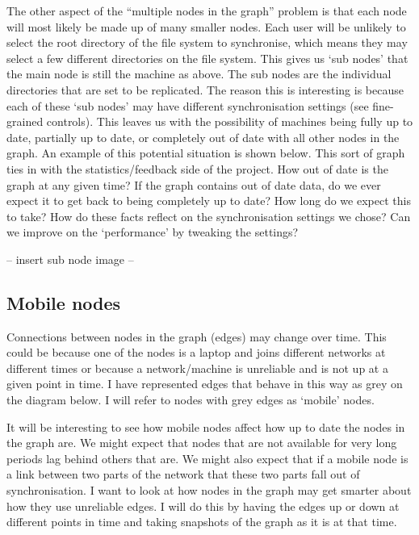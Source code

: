 \documentclass[12pt]{article}
\begin{document}
The other aspect of the ``multiple nodes in the graph'' problem
is that each node will most likely be made up of many smaller nodes.
Each user will be unlikely to select the root directory of the
file system to synchronise, which means they may select a few
different directories on the file system. This gives us ‘sub nodes’
that the main node is still the machine as above. The sub nodes are
the individual directories that are set to be replicated.
The reason this is interesting is because each of these ‘sub nodes’
may have different synchronisation settings (see fine-grained controls).
This leaves us with the possibility of machines being fully up to date,
partially up to date, or completely out of date with all other nodes in
the graph. 
%
An example of this potential situation is shown below.
This sort of graph ties in with the statistics/feedback side of the
project. How out of date is the graph at any given time?
If the graph contains out of date data, do we ever expect it
to get back  to being completely up to date? How long do we expect
this to take? How do these facts reflect on the synchronisation settings
we chose? Can we improve on the ‘performance’ by tweaking the settings?

-- insert sub node image --

\subsection{Mobile nodes}

Connections between nodes in the graph (edges) may
change over time. This could be because one of the nodes
is a laptop and joins different networks at different
times or because a network/machine is unreliable and is
not up at a given point in time. I have represented
edges that behave in this way as grey on the diagram below.
I will refer to nodes with grey edges as `mobile' nodes.

It will be interesting to see how mobile nodes affect how
up to date the nodes in the graph are. We might expect that
nodes that are not available for very long periods lag behind
others that are. We might also expect that if a mobile
node is a link between two parts of the network that
these two parts fall out of synchronisation. I want to look
at how nodes in the graph may get smarter about how
they use unreliable edges. I will do this by having
the edges up or down at different points in time
and taking snapshots of the graph as it is at that time.
\end{document}
